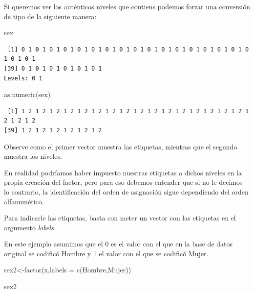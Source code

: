 \documentclass[
  letterpaper,
  DIV=11,
  numbers=noendperiod]{scrreprt}
\newenvironment{Shaded}{\begin{snugshade}}{\end{snugshade}}
\newcommand{\AttributeTok}[1]{\textcolor[rgb]{0.40,0.45,0.13}{#1}}
\newcommand{\FunctionTok}[1]{\textcolor[rgb]{0.28,0.35,0.67}{#1}}
\newcommand{\NormalTok}[1]{\textcolor[rgb]{0.00,0.23,0.31}{#1}}
\newcommand{\OtherTok}[1]{\textcolor[rgb]{0.00,0.23,0.31}{#1}}
\newcommand{\StringTok}[1]{\textcolor[rgb]{0.13,0.47,0.30}{#1}}
\begin{document}
Si queremos ver los auténticos niveles que contiens podemos forzar una
conversión de tipo de la siguiente manera:

\begin{Shaded}
\begin{Highlighting}[]
\NormalTok{sex}
\end{Highlighting}
\end{Shaded}

\begin{verbatim}
 [1] 0 1 0 1 0 1 0 1 0 1 0 1 0 1 0 1 0 1 0 1 0 1 0 1 0 1 0 1 0 1 0 1 0 1 0 1 0 1
[39] 0 1 0 1 0 1 0 1 0 1 0 1
Levels: 0 1
\end{verbatim}

\begin{Shaded}
\begin{Highlighting}[]
\FunctionTok{as.numeric}\NormalTok{(sex)}
\end{Highlighting}
\end{Shaded}

\begin{verbatim}
 [1] 1 2 1 2 1 2 1 2 1 2 1 2 1 2 1 2 1 2 1 2 1 2 1 2 1 2 1 2 1 2 1 2 1 2 1 2 1 2
[39] 1 2 1 2 1 2 1 2 1 2 1 2
\end{verbatim}

Observe como el primer vector muestra las etiquetas, mientras que el
segundo muestra los niveles.

En realidad podríamos haber impuesto nuestras etiquetas a dichos niveles
en la propia creación del factor, pero para eso debemos entender que si
no le decimos lo contrario, la identificación del orden de asignación
sigue dependiendo del orden alfanumérico.

Para indicarle las etiquetas, basta con meter un vector con las
etiquetas en el argumento \emph{labels.}

En este ejemplo asumimos que el 0 es el valor con el que en la base de
datos original se codificó Hombre y 1 el valor con el que se codificó
Mujer.

\begin{Shaded}
\begin{Highlighting}[]
\NormalTok{sex2}\OtherTok{\textless{}{-}}\FunctionTok{factor}\NormalTok{(x,}\AttributeTok{labels =} \FunctionTok{c}\NormalTok{(}\StringTok{\textquotesingle{}Hombre\textquotesingle{}}\NormalTok{,}\StringTok{\textquotesingle{}Mujer\textquotesingle{}}\NormalTok{))}
\end{Highlighting}
\end{Shaded}

\begin{Shaded}
\begin{Highlighting}[]
\NormalTok{sex2}
\end{Highlighting}
\end{Shaded}
\end{document}
